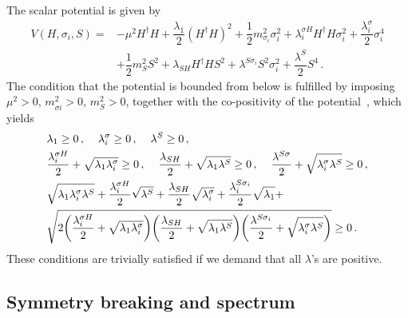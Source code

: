 \documentclass[12pt,letterpaper]{article}
\begin{document}
The scalar potential is given by
\begin{align}
\label{eq:ScalarPotential}
V(H,\sigma_i,S) =& -\mu^2 H^{\dagger}H + \dfrac{\lambda_1}{2}(H^{\dagger}H)^2 + \dfrac{1}{2}m_{\sigma_i}^2 \sigma_i^2 + \lambda^{\sigma H}_i H^{\dagger}H \sigma_i^2
+ \dfrac{\lambda_i^{\sigma}}{2} \sigma_i^4 \nonumber \\
&+ \dfrac{1}{2} m_S^2 S^2 + \lambda_{SH} H^{\dagger}H S^2 
+ \lambda^{S\sigma_i}S^2\sigma_i^2
+ \dfrac{\lambda^S}{2} S^4 \,.
\end{align}
The condition that the potential is bounded from below is fulfilled by imposing $\mu^2 >0$, $m_{\sigma i}^2 >0$, $m_S^2 >0$, together with the co-positivity of the potential~\cite{Kannike:2012pe}, which yields
\begin{align}
\label{eq:cond-bounded}
&\lambda_1 \geq 0\,,\hspace{0.4 cm} \lambda_i^{\sigma} \geq 0\,,
\hspace{0.4 cm} \lambda^S \geq 0\,,\\
&\dfrac{\lambda_i^{\sigma H}}{2}+\sqrt{\lambda_1\lambda_i^\sigma}  \geq 0\,,\hspace{0.4 cm} 
\dfrac{\lambda_{SH}}{2}+\sqrt{\lambda_1\lambda^S} \geq 0\,,\hspace{0.4 cm}
\dfrac{\lambda^{S\sigma}}{2}+\sqrt{\lambda_i^{\sigma}\lambda^S} \geq 0\,,\\
&\sqrt{\lambda_1\lambda_i^\sigma \lambda^S} +\dfrac{\lambda_i^{\sigma H}}{2}\sqrt{\lambda^S}
 +\dfrac{\lambda_{SH}}{2}\sqrt{\lambda_i^\sigma}
 +\dfrac{\lambda_i^{S\sigma_i}}{2}\sqrt{\lambda_1}+\nonumber\\
 &\sqrt{2\bigg(\dfrac{\lambda_i^{\sigma H}}{2}+\sqrt{\lambda_1\lambda_i^\sigma}\bigg)
 \bigg(\dfrac{\lambda_{SH}}{2}+\sqrt{\lambda_1\lambda^S}\bigg)
 \bigg(\dfrac{\lambda^{S\sigma_i}}{2}+\sqrt{\lambda_i^\sigma\lambda^S}\bigg)}\geq 0\,.
\end{align}
These conditions are trivially satisfied if we demand that all $\lambda$'s are positive.


\subsection{Symmetry breaking and spectrum}
\end{document}
